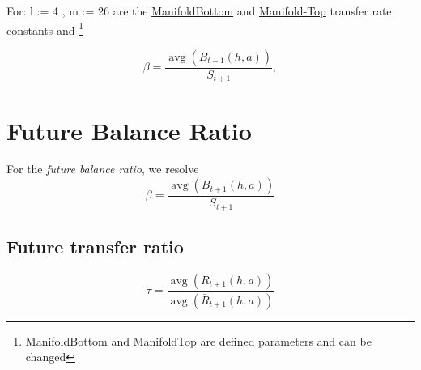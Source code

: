For: l := 4 , m := 26 are the \url{ManifoldBottom} and \url{Manifold-Top} transfer rate constants and \footnote{ManifoldBottom and ManifoldTop are defined parameters and can be changed}

\label{sec:Calculations}
\begin{equation}
\beta=\frac{\operatorname{avg}\left(B_{t+1}(h, a)\right)}{S_{t+1}}, 
\end{equation}
\newpage
\section{Future Balance Ratio}
For the \textit{future balance ratio}, we resolve
\label{sec:Calculations}
\begin{equation}
    \beta=\frac{\operatorname{avg}\left(B_{t+1}(h, a)\right)}{S_{t+1}}
\end{equation}
\label{future transfer ratio}
\subsection{Future transfer ratio}
\begin{equation}
    \tau=\frac{\operatorname{avg}\left(R_{t+1}(h, a)\right)}{\operatorname{avg}\left(\bar{R}_{t+1}(h, a)\right)}
\end{equation}

